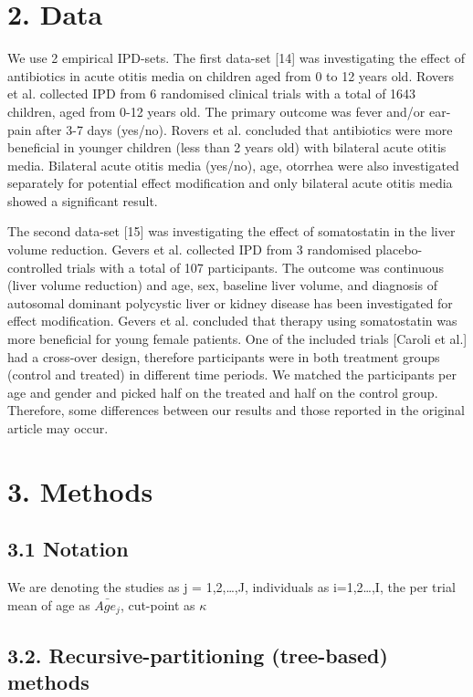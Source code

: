 \documentclass[14pt,]{article}
\begin{document}
\section{2. Data}\label{data}

We use 2 empirical IPD-sets. The first data-set {[}14{]} was
investigating the effect of antibiotics in acute otitis media on
children aged from 0 to 12 years old. Rovers et al. collected IPD from 6
randomised clinical trials with a total of 1643 children, aged from 0-12
years old. The primary outcome was fever and/or ear-pain after 3-7 days
(yes/no). Rovers et al. concluded that antibiotics were more beneficial
in younger children (less than 2 years old) with bilateral acute otitis
media. Bilateral acute otitis media (yes/no), age, otorrhea were also
investigated separately for potential effect modification and only
bilateral acute otitis media showed a significant result.

The second data-set {[}15{]} was investigating the effect of
somatostatin in the liver volume reduction. Gevers et al. collected IPD
from 3 randomised placebo-controlled trials with a total of 107
participants. The outcome was continuous (liver volume reduction) and
age, sex, baseline liver volume, and diagnosis of autosomal dominant
polycystic liver or kidney disease has been investigated for effect
modification. Gevers et al. concluded that therapy using somatostatin
was more beneficial for young female patients. One of the included
trials {[}Caroli et al.{]} had a cross-over design, therefore
participants were in both treatment groups (control and treated) in
different time periods. We matched the participants per age and gender
and picked half on the treated and half on the control group. Therefore,
some differences between our results and those reported in the original
article may occur.

\section{3. Methods}\label{methods}

\subsection{3.1 Notation}\label{notation}

We are denoting the studies as j = 1,2,\ldots{},J, individuals as
i=1,2\ldots{},I, the per trial mean of age as \(\bar{Age_j}\), cut-point
as \(\kappa\)

\subsection{3.2. Recursive-partitioning (tree-based)
methods}\label{recursive-partitioning-tree-based-methods}
\end{document}
